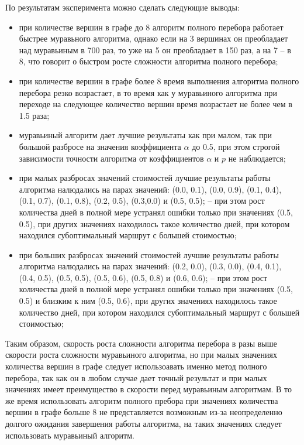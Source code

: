 По результатам эксперимента можно сделать следующие выводы:
\begin{itemize}[left=\parindent]
    \item при количестве вершин в графе до 8 алгоритм полного перебора работает
        быстрее муравьного алгоритма, однако если на 3 вершинах он преобладает
        над муравьиным в 700 раз, то уже на 5 он преобладает в 150 раз, а на 7
        -- в 8, что говорит о быстром росте сложности алгоритма полного
        перебора; 
    \item при количестве вершин в графе более 8 время выполнения алгоритма
        полного перебора резко возрастает, в то время как у муравьиного
        алгоритма при переходе на следующее количество вершин время возрастает
        не более чем в 1.5 раза;
    \item муравьиный алгоритм дает лучшие результаты как при малом, так при
        большой разбросе на значения коэффициента $\alpha$ до 0.5, при этом
        строгой зависимости точности алгоритма от коэффициентов $\alpha$ и $p$
        не наблюдается;
    \item при малых разбросах значений стоимостей лучшие результаты работы
        алгоритма налюдались на парах значений: (0.0, 0.1), (0.0, 0.9), (0.1,
        0.4), (0.1, 0.7), (0.1, 0.8), (0.2, 0.5), (0.3,0.0) и (0.5, 0.5); --
        при этом рост количества дней в полной мере устранял ошибки только при
        значениях (0.5, 0.5), при других значениях находилось такое количество
        дней, при котором находился субоптимальный маршрут с большей
        стоимостью;
    \item при больших разбросах значений стоимостей лучшие результаты работы
        алгоритма налюдались на парах значений: (0.2, 0.0), (0.3, 0.0), (0.4,
        0.1), (0.4, 0.5), (0.5, 0.5), (0.5, 0.6), (0.5, 0.8) и (0.6, 0.6); --
        при этом рост количества дней в полной мере устранял ошибки только при
        значениях (0.5, 0.5) и близким к ним (0.5, 0.6), при других значениях
        находилось такое количество дней, при котором находился субоптимальный
        маршрут с большей стоимостью;
\end{itemize}

Таким образом, скорость роста сложности алгоритма перебора в разы выше скорости
роста сложности муравьиного алгоритма, но при малых значениях количества вершин
в графе следует использоавать именно метод полного перебора, так как он в любом
случае дает точный результат и при малых значениях имеет преимущество в
скорости перед муравьиным алгоритмам. В то же время использовать алгоритм
полного пребора при значениях количества вершин в графе больше 8 не
представляется возможным из-за неопределенно долгого ожидания завершения работы
алгоритма, на таких значениях следует использовать муравьиный алгоритм.

